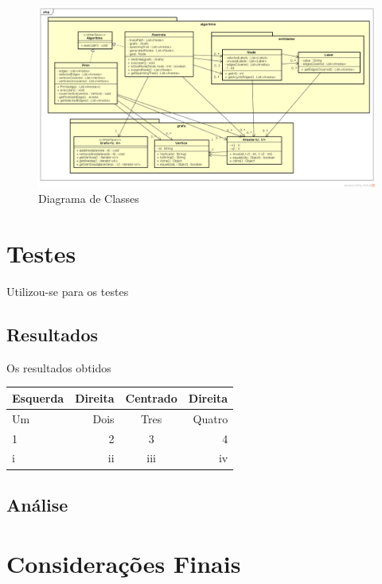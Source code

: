 \documentclass[12pt]{article}
\begin{document}
		\begin{landscape}
		\centering
		\begin{figure}[p]
		\includegraphics[width=1.4\textwidth]{ClassDiagram.png}
		\caption{Diagrama de Classes}
		\label{fig:classDiagram}
		\end{figure}
		\end{landscape}
		\restoregeometry

\section{Testes}\label{sec:testes}
	
	Utilizou-se para os testes 

	\subsection{Resultados}\label{sec:resultados}
		
		Os resultados obtidos 

		\begin{tabular}{l|r|c|r} \hline
			Esquerda & Direita & Centrado & Direita \\ \hline
			Um & Dois & Tres & Quatro \\
			1 & 2 & 3 & 4 \\
			i & ii & iii & iv \\ \hline
		\end{tabular}
		
	\subsection{Análise}\label{sec:analise}

\section{Considerações Finais}\label{sec:conclusao}
	
\end{document}
